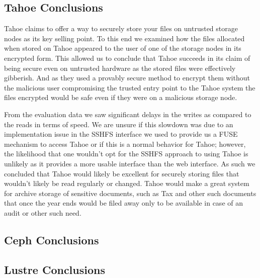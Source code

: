 \documentclass[11pt]{article}
\begin{document}
\subsection{Tahoe Conclusions}

Tahoe claims to offer a way to securely store your files on untrusted
storage nodes as its key selling point. To this end we examined how
the files allocated when stored on Tahoe appeared to the user of one
of the storage nodes in its encrypted form. This allowed us to
conclude that Tahoe succeeds in its claim of being secure even on
untrusted hardware as the stored files were effectively gibberish. And
as they used a provably secure method to encrypt them without the
malicious user compromising the trusted entry point to the Tahoe
system the files encrypted would be safe even if they were on a
malicious storage node.

From the evaluation data we saw significant delays in the writes as
compared to the reads in terms of speed. We are unsure if this
slowdown was due to an implementation issue in the SSHFS interface we
used to provide us a FUSE mechanism to access Tahoe or if this is a
normal behavior for Tahoe; however, the likelihood that one wouldn't
opt for the SSHFS approach to using Tahoe is unlikely as it provides a
more usable interface than the web interface. As such we concluded
that Tahoe would likely be excellent for securely storing files that
wouldn't likely be read regularly or changed. Tahoe would make a great
system for archive storage of sensitive documents, such as Tax and
other such documents that once the year ends would be filed away only
to be available in case of an audit or other such need.

\subsection{Ceph Conclusions}

\subsection{Lustre Conclusions}
\end{document}
